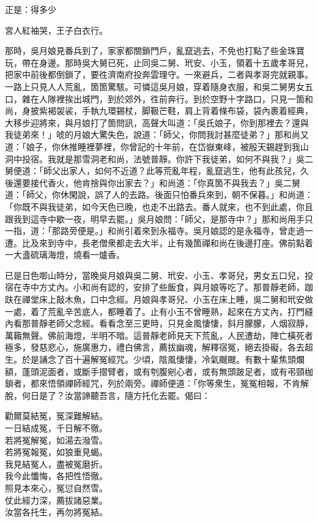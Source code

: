 正是：得多少

\begin{myquote}
宮人紅袖哭，王子白衣行。
\end{myquote}

那時，吳月娘見番兵到了，家家都關鎖門戶，亂竄逃去，不免也打點了些金珠寶玩，帶在身邊。那時吳大舅已死，止同吳二舅、玳安、小玉，領着十五歲孝哥兒，把家中前後都倒鎖了，要徃濟南府投奔雲理守。一來避兵，二者與孝哥完就親事。一路上只見人人荒亂，箇箇驚駭。可憐這吳月娘，穿着隨身衣服，和吳二舅男女五口，雜在人隊裡挨出城門，到於郊外，徃前奔行。到於空野十字路口，只見一箇和尚，身披紫褐袈裟，手執九環錫杖，脚靸芒鞋，肩上背着條布袋，袋內裹着經典，大移步迎將來，與月娘打了箇問訊，高聲大叫道：「吳氏娘子，你到那裡去？還與我徒弟來！」唬的月娘大驚失色，說道：「師父，你問我討甚麼徒弟？」那和尚又道：「娘子，你休推睡裡夢裡，你曾記的十年前，在岱嶽東峰，被殷天錫趕到我山洞中投宿。我就是那雪洞老和尚，法號普靜。你許下我徒弟，如何不與我？」吳二舅便道：「師父出家人，如何不近道？此等荒亂年程，亂竄逃生，他有此孩兒，久後還要接代香火，他肯捨與你出家去？」和尚道：「你真箇不與我去？」吳二舅道：「師父，你休閑說，誤了人的去路。後面只怕番兵來到，朝不保暮。」和尚道：「你既不與我徒弟，如今天色已晚，也走不出路去。番人就來，也不到此處，你且跟我到這寺中歇一夜，明早去罷。」吳月娘問：「師父，是那寺中？」那和尚用手只一指，道：「那路旁便是。」和尚引着來到永福寺。吳月娘認的是永福寺，曾走過一遭。比及來到寺中，長老僧衆都走去大半，止有幾箇禪和尚在後邊打座。佛前點着一大盞硫璃海燈，燒看一爐香。

已是日色啣山時分，當晚吳月娘與吳二舅、玳安、小玉、孝哥兒，男女五口兒，投宿在寺中方丈內。小和尚有認的，安排了些飯食，與月娘等吃了。那普靜老師，跏趺在禪堂床上敲木魚，口中念經。月娘與孝哥兒、小玉在床上睡，吳二舅和玳安做一處，着了荒亂辛苦底人，都睡着了。止有小玉不曾睡熟，起來在方丈內，打門縫內看那普靜老師父念經。看看念至三更時，只見金風悽悽，斜月朦朦，人烟寂靜，萬籟無聲。佛前海燈，半明不暗。這普靜老師見天下荒亂，人民遭劫，陣亡橫死者極多，發慈悲心，施廣惠力，禮白佛言，薦拔幽魂，解釋宿冤，絕去掛礙，各去超生。於是誦念了百十遍解冤經咒。少頃，陰風悽悽，冷氣颼颼。有數十輩焦頭爛額，蓬頭泥面者，或斷手摺臂者，或有刳腹剜心者，或有無頭跛足者，或有弔頸枷鎖者，都來悟領禪師經咒，列於兩旁。禪師便道：「你等衆生，冤冤相報，不肯解脫，何日是了？汝當諦聽吾言，隨方托化去罷。偈曰：

\begin{myquote}
勸爾莫結冤，冤深難解結。\\一日結成冤，千日解不徹。\\若將冤解冤，如湯去潑雪。\\若將冤報冤，如狼重見蝎。\\我見結冤人，盡被冤磨折。\\我今此懺悔，各把性悟徹。\\照見本來心，冤愆自然雪。\\仗此經力深，薦拔諸惡業。\\汝當各托生，再勿將冤結。{}
\end{myquote}

